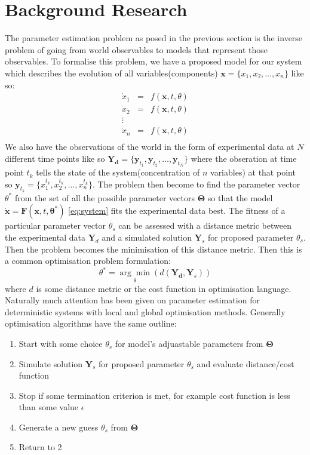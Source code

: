 \documentclass[12pt,a4paper,titlepage]{article}
\begin{document}
\section{Background Research}
\label{sec:background}
The parameter estimation problem as posed in the previous section is the inverse problem of going from world observables to models that represent those observables. To formalise this problem, we have a proposed model for our system which describes the evolution of all variables(components) $\mathbf{x} = \{x_1, x_2, \dots, x_n\}$ like so:
\begin{equation}
\label{eq:system}
\begin{array}{lcl}
\dot x_1 & = & f(\mathbf{x}, t, \theta) \\
\dot x_2& = & f(\mathbf{x}, t, \theta) \\
\vdots \\
\dot x_n & = & f(\mathbf{x}, t, \theta) \\
\end{array}
\end{equation}
We also have the observations of the world in the form of experimental data at $N$ different time points like so $\mathbf{Y_d} = \{\mathbf{y}_{t_{1}},  \mathbf{y}_{t_{2}}, \dots, \mathbf{y}_{t_{N}}\}$ where the obseration at time point $t_{k}$ tells the state of the system(concentration of $n$ variables) at that point so 
$\mathbf{y}_{t_{k}} =\{ x_{1}^{t_{k}},  x_{2}^{t_{k}}, \dots,  x_{n}^{t_{k}} \}$. The problem then become to find the parameter vector $\theta^*$ from the set of all the possible parameter vectors $\mathbf{\Theta}$ so that the model $\mathbf{\dot x} = \mathbf{F}(\mathbf{x}, t, \mathbf{\theta^*})$  \ref{eq:system} fits the experimental data best. The fitness of a particular parameter vector $\theta_{s}$ can be assessed with a distance metric between the experimental data $\mathbf{Y}_{d}$ and a simulated solution $\mathbf{Y}_{s}$ for proposed parameter $\theta_{s}$. Then the problem becomes the minimisation of this distance metric. Then this is a common optimisation problem formulation: 
\begin{equation*}
\theta^* = \underset{\theta}{\arg\min}(d(\mathbf{Y_{d}},\mathbf{Y}_{s})) 
\end{equation*}
where $d$ is some distance metric or the cost function in optimisation language. Naturally much attention has been given on parameter estimation for deterministic systems with local and global optimisation methods\cite{Moles2003param}.  Generally optimisation algorithms have the same outline:
\begin{enumerate}[noitemsep]
\item{Start with some choice $\theta_{s}$ for model's adjuastable parameters from $\mathbf{\Theta}$}
\item{Simulate solution $\mathbf{Y}_{s}$ for proposed parameter $\theta_{s}$ and evaluate distance/cost function}
\item{Stop if some termination criterion is met, for example cost function is less than some value $\epsilon$}
\item{Generate a new guess $\theta_{s}$ from $\mathbf{\Theta}$}
\item{Return to 2}
\end{enumerate}
\end{document}

